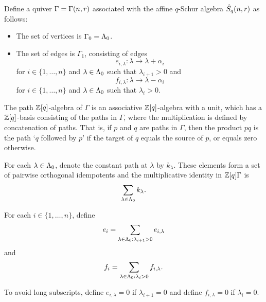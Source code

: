 \documentclass[a4paper, 11pt]{report}
\begin{document}
Define a quiver $\Gamma=\Gamma(n,r)$ associated with the affine $q$-Schur algebra $\hat{S}_q(n,r)$ as follows:
\begin{itemize}
\item
The set of vertices is $\Gamma_0=\Lambda_0{}$.
\item
The set of edges is $\Gamma_1$, consisting of edges
\begin{equation*}
e_{i,\lambda}\colon \lambda\to\lambda+\alpha_i
\end{equation*}
for $i\in\{1,\ldots,n\}$ and $\lambda\in\Lambda_0{}$ such that $\lambda_{i+1}>0$ and
\begin{equation*}
f_{i,\lambda}\colon \lambda\to\lambda-\alpha_i
\end{equation*}
for $i\in\{1,\ldots,n\}$ and $\lambda\in\Lambda_0{}$ such that $\lambda_i>0$. 
\end{itemize}

The path $\mathbb{Z}[q]$-algebra of $\Gamma$ is an associative $\mathbb{Z}[q]$-algebra with a unit, which has a $\mathbb{Z}[q]$-basis consisting of the paths in $\Gamma$, where the multiplication is defined by concatenation of paths. That is, if $p$ and $q$ are paths in $\Gamma$, then the product $pq$ is the path `$q$ followed by $p$' if the target of $q$ equals the source of $p$, or equals zero otherwise. 

For each $\lambda\in\Lambda_0{}$, denote the constant path at $\lambda$ by $k_\lambda$. These elements form a set of pairwise orthogonal idempotents and the multiplicative identity in $\mathbb{Z}[q]\Gamma$ is
\begin{equation*}
\sum_{\lambda\in\Lambda_0{}} k_\lambda.
\end{equation*}

For each $i\in\{1,\ldots,n\}$, define
\begin{equation*}
e_i = \sum_{\lambda\in\Lambda_0{}:\lambda_{i+1}>0} e_{i,\lambda}
\end{equation*}
and
\begin{equation*}
f_i = \sum_{\lambda\in\Lambda_0{}: \lambda_i>0} f_{i,\lambda}.
\end{equation*}

To avoid long subscripts, define $e_{i,\lambda}=0$ if $\lambda_{i+1}=0$ and define $f_{i,\lambda}=0$ if $\lambda_i=0$.
\end{document}
